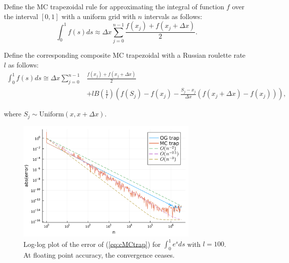 \documentclass[a4paper,12pt]{article}
\begin{document}
\begin{definition} \label{MCtrap}
  Define the MC trapezoidal rule for approximating the integral
  of function $f$ over the interval $[0, 1]$ with a uniform grid
  with $n$ intervals as follows:
  \begin{equation}
    \int_{0}^{1} f(s) ds \approx \Delta x \sum_{j=0}^{n-1}  \frac{f(x_{j}) + f(x_{j}+\Delta x)}{2} .
  \end{equation}


  Define the  corresponding composite MC trapezoidal
  with a Russian roulette rate $l$ as follows:
  \begin{align} \label{eq:cMCtrap}
    \int_{0}^{1} f(s) ds \cong \Delta x \sum_{j=0}^{n-1} & \frac{f(x_{j}) + f(x_{j}+\Delta x)}{2} \nonumber \\
                                                         & + l B\left(\frac{1}{l}\right)
    \left(f(S_j) - f(x_{j}) - \frac{S_j - x_{j}}{\Delta x}(f(x_{j}+\Delta x) - f(x_{j}))\right),
  \end{align}


  where $S_j \sim \text{Uniform}(x,x+\Delta x)$.

\end{definition}

\begin{figure}[h!]
  \centering
  \includegraphics[width=0.8\textwidth]{julia_plots/trap_example.pdf}
  \caption{Log-log plot of the error of (\ref{eq:cMCtrap}) for
  $\int_{0}^{1}e^{s}ds$ with $l=100$. At floating point accuracy,
  the convergence ceases.
  }
  \label{fig:MCtrap}
\end{figure}
\end{document}
